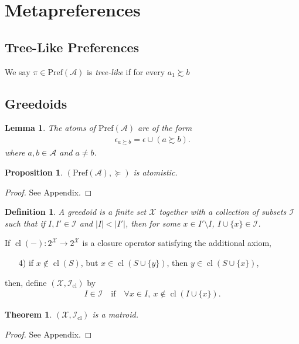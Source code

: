 \documentclass[conference]{ieeeconf}
\newcommand{\powerset}[1]{2^{#1}}
\newcommand{\A}{\mathcal{A}}
\newcommand{\X}{\mathcal{X}}
\newcommand{\I}{\mathcal{I}}
\newcommand{\Pref}{\mathrm{Pref}}
\newcommand{\prefers}{\succsim}
\DeclareMathOperator{\cl}{cl}
\newtheorem{theorem}{Theorem}
\newtheorem{lemma}{Lemma}
\newtheorem{proposition}{Proposition}
\newtheorem{definition}{Definition}
\begin{document}
\section{Metapreferences}

\subsection{Tree-Like Preferences}

We say $\pi \in \Pref(\A)$ is \emph{tree-like} if for every $a_1 \prefers b$

\subsection{Greedoids}

\begin{lemma}
    The atoms of $\Pref(\A)$ are of the form
    \begin{align*}
        \epsilon_{a \prefers b} = \epsilon \cup (a \prefers b).
    \end{align*}
    where $a, b \in \A$ and $a \neq b$.
\end{lemma}

\begin{proposition}
    $(\Pref(\A), \succeq)$ is atomistic.
\end{proposition}
\begin{proof}
See Appendix.
\end{proof}

\begin{definition}
    A \emph{greedoid} is a finite set $\X$ together with a collection of subsets $\I$ such that if $I, I' \in \mathcal{I}$ and $|I| < |I'|$, then for some $x \in I' \setminus I$, $I \cup \{x\} \in \I$.
\end{definition}

If $\cl(-): \powerset{\X} \to \powerset{\X}$ is a closure operator satisfying the additional axiom,
\begin{enumerate}
    \item[4)] if $x \notin \cl(S)$, but $x \in \cl(S \cup \{y\})$, then $y \in \cl(S \cup \{x\})$,
\end{enumerate}
then, define $(\X,\I_{\cl})$ by
\begin{align*}
    I \in \I \quad \text{if} \quad \forall x \in I,~x \notin \cl(I \cup \{x\}).
\end{align*}
\begin{theorem}
    $(\X, \I_{\cl})$ is a matroid.
\end{theorem}
\begin{proof}
    See Appendix.
\end{proof}
\end{document}
